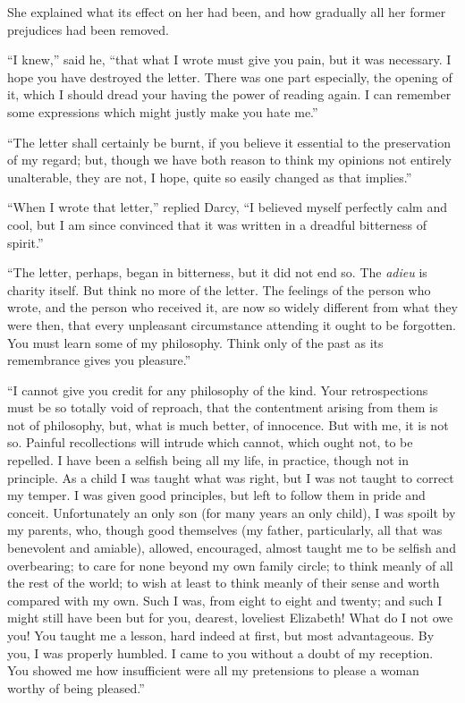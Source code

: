\documentclass[12pt,english]{book}
\begin{document}
She explained what its effect on her had been, and how gradually all
her former prejudices had been removed.

{}``I knew,'' said he, {}``that what I wrote must give you pain,
but it was necessary. I hope you have destroyed the letter. There
was one part especially, the opening of it, which I should dread your
having the power of reading again. I can remember some expressions
which might justly make you hate me.''

{}``The letter shall certainly be burnt, if you believe it essential
to the preservation of my regard; but, though we have both reason
to think my opinions not entirely unalterable, they are not, I hope,
quite so easily changed as that implies.''

{}``When I wrote that letter,'' replied Darcy, {}``I believed myself
perfectly calm and cool, but I am since convinced that it was written
in a dreadful bitterness of spirit.''

{}``The letter, perhaps, began in bitterness, but it did not end
so. The \emph{adieu} is charity itself. But think no more of the letter.
The feelings of the person who wrote, and the person who received
it, are now so widely different from what they were then, that every
unpleasant circumstance attending it ought to be forgotten. You must
learn some of my philosophy. Think only of the past as its remembrance
gives you pleasure.''

{}``I cannot give you credit for any philosophy of the kind. Your
retrospections must be so totally void of reproach, that the contentment
arising from them is not of philosophy, but, what is much better,
of innocence. But with me, it is not so. Painful recollections will
intrude which cannot, which ought not, to be repelled. I have been
a selfish being all my life, in practice, though not in principle.
As a child I was taught what was right, but I was not taught to correct
my temper. I was given good principles, but left to follow them in
pride and conceit. Unfortunately an only son (for many years an only
child), I was spoilt by my parents, who, though good themselves (my
father, particularly, all that was benevolent and amiable), allowed,
encouraged, almost taught me to be selfish and overbearing; to care
for none beyond my own family circle; to think meanly of all the rest
of the world; to wish at least to think meanly of their sense and
worth compared with my own. Such I was, from eight to eight and twenty;
and such I might still have been but for you, dearest, loveliest Elizabeth!
What do I not owe you! You taught me a lesson, hard indeed at first,
but most advantageous. By you, I was properly humbled. I came to you
without a doubt of my reception. You showed me how insufficient were
all my pretensions to please a woman worthy of being pleased.''
\end{document}
